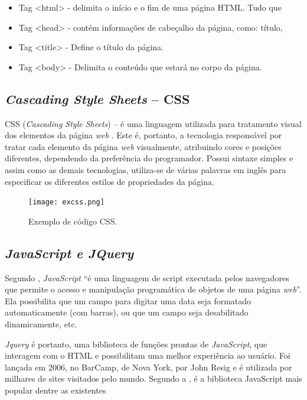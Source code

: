 \documentclass[
	12pt,				%
    oneside,			%
	a4paper,			%
	english,			%
	french,				%
	spanish,			%
	brazil,				%
	]{abntex2}
\begin{document}
\begin{itemize}

	\item Tag <html> - delimita o início e o fim de uma página HTML. Tudo que
	\item Tag <head> - contém informações de cabeçalho da página, como: título,
	\item Tag <title> - Define o título da página.
	\item Tag <body> - Delimita o conteúdo que estará no corpo da página.

\end{itemize}


\subsection{\textit{Cascading Style Sheets} – CSS}

CSS (\textit{Cascading Style Sheets}) – é uma linguagem utilizada para tratamento
visual dos elementos da página \textit{web} \cite{folle}. Este é, portanto, a tecnologia
responsável por tratar cada elemento da página \textit{web} visualmente, atribuindo cores e
posições diferentes, dependendo da preferência do programador. Possui sintaxe
simples e assim como as demais tecnologias, utiliza-se de várias palavras em inglês
para especificar os diferentes estilos de propriedades da página.

\begin{figure} [hbt] 
\label{figura1} 
\caption{Exemplo de código CSS.}
\begin{center}
\texttt{[image: excss.png]}
\end{center}
\end{figure}

\subsection{\textit{JavaScript e JQuery}}

Segundo , \textit{JavaScript} “é uma linguagem de script executada pelos
navegadores que permite o acesso e manipulação programática de objetos de uma
página \textit{web}”. Ela possibilita que um campo para digitar uma data seja formatado
automaticamente (com barras), ou que um campo seja desabilitado dinamicamente,
etc. 

\textit{Jquery} é portanto, uma biblioteca de funções prontas de \textit{JavaScript}, que
interagem com o HTML e possibilitam uma melhor experiência ao usuário. Foi lançada
em 2006, no BarCamp, de Nova York, por John Resig e é utilizada por milhares de
sites visitados pelo mundo. Segundo a , é a biblioteca JavaScript
mais popular dentre as existentes
\end{document}
